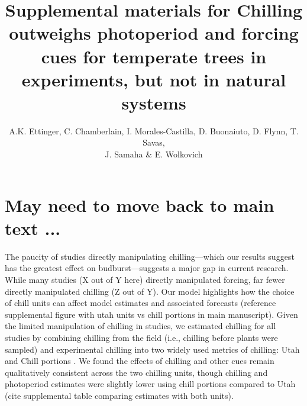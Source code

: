 \documentclass{article}
\begin{document}

\title{Supplemental materials  for Chilling outweighs photoperiod and forcing cues for temperate trees in experiments, but not in natural systems} %

\author{A.K. Ettinger, C. Chamberlain, I. Morales-Castilla, D. Buonaiuto, D. Flynn, T. Savas, \\J. Samaha \& E. Wolkovich}
\maketitle  %


\section*{May need to move back to main text ...}

\par The paucity of studies directly manipulating chilling---which our results suggest has the greatest effect on budburst---suggests a major gap in current research. While many studies (X out of Y here) directly manipulated forcing, far fewer directly manipulated chilling (Z out of Y). 
Our model highlights how the choice of chill units can affect model estimates and associated forecasts (reference supplemental figure with utah units vs chill portions in main manuscript). 
Given the limited manipulation of chilling in studies, we estimated chilling for all studies by combining chilling from the field (i.e., chilling before plants were sampled) and experimental chilling into two widely used metrics of chilling: Utah and Chill portions \citep{dennis2003}. We found the effects of chilling and other cues remain qualitatively consistent across the two chilling units, though chilling and photoperiod estimates were slightly lower using chill portions compared to Utah (cite supplemental table comparing estimates with both units).  %
\end{document}
